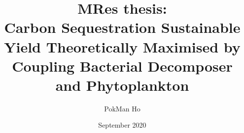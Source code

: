 \documentclass[a4paper,11pt]{article}
\title{MRes thesis:\\Carbon Sequestration Sustainable Yield Theoretically Maximised by Coupling Bacterial Decomposer and Phytoplankton}
\author{PokMan Ho}
\date{September 2020}
\begin{document}
\maketitle










\nocite{*}\printbibliography
\clearpage

\end{document}
